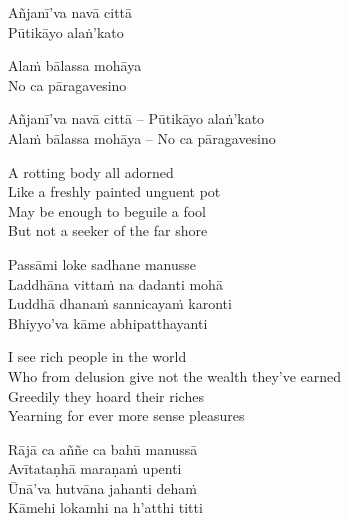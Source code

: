 \ifninebythirteen

\begin{pali-hang-verses}
  Añjanī'va navā cittā\\
  Pūtikāyo alaṅ'kato
\end{pali-hang-verses}
\begin{pali-hang-together}
  Alaṁ bālassa mohāya\\
  No ca pāragavesino
\end{pali-hang-together}

\clearpage

\else

\begin{verses}
  Añjanī'va navā cittā – Pūtikāyo alaṅ'kato\\
  Alaṁ bālassa mohāya – No ca pāragavesino
\end{verses}

\fi

\begin{english-verses}
  A rotting body all adorned\\
  Like a freshly painted unguent pot\\
  May be enough to beguile a fool\\
  But not a seeker of the far shore
\end{english-verses}

\begin{verses}
  Passāmi loke sadhane manusse\\
  Laddhāna vittaṁ na dadanti mohā\\
  Luddhā dhanaṁ sannicayaṁ karonti\\
  Bhiyyo'va kāme abhipatthayanti
\end{verses}

\begin{english-verses}
  I see rich people in the world\\
  Who from delusion give not the wealth they've earned\\
  Greedily they hoard their riches\\
  Yearning for ever more sense pleasures
\end{english-verses}

\ifbfive\clearpage\fi

\begin{verses}
  Rājā ca aññe ca bahū manussā\\
  Avītataṇhā maraṇaṁ upenti\\
  Ūnā'va hutvāna jahanti dehaṁ\\
  Kāmehi lokamhi na h'atthi titti
\end{verses}

